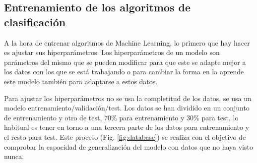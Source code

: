 \begin{table}[htpb!]
    \centering
    \caption{Equivalencia entre algoritmo e implementación}
    \label{tab:equiv_models}
\end{table}

\subsection{Entrenamiento de los algoritmos de clasificación}


A la hora de entrenar algoritmos de Machine Learning, lo primero que hay hacer es ajustar sus hiperparámetros. Los hiperparámetros de un modelo son parámetros del mismo que se pueden modificar para que este se adapte mejor a los datos con los que se está trabajando o para cambiar la forma en la aprende este modelo también para adaptarse a estos datos.

Para ajustar los hiperparámetros no se usa la completitud de los datos, se usa un modelo entrenamiento/validación/test. Los datos se han dividido en un conjunto de entrenamiento y otro de test, 70\% para entrenamiento y 30\% para test, lo habitual es tener en torno a una tercera parte de los datos para entrenamiento y el resto para test. Este proceso (Fig. \ref{fig:database}) se realiza con el objetivo de comprobar la capacidad de generalización del modelo con datos que no haya visto nunca.

